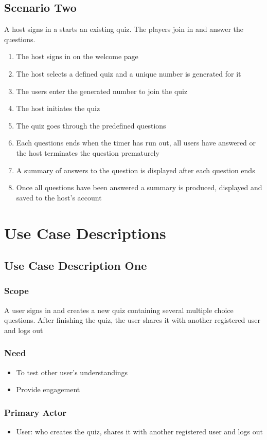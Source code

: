 \documentclass[a4paper]{article}
\begin{document}
	\subsection{Scenario Two}
	A host signs in a starts an existing quiz. The players join in and answer the questions.
	\begin{enumerate}
		\item The host signs in on the welcome page
		\item The host selects a defined quiz and a unique number is generated for it
		\item The users enter the generated number to join the quiz
		\item The host initiates the quiz
		\item The quiz goes through the predefined questions
		\item Each questions ends when the timer has run out, all users have answered or the host terminates the question prematurely
		\item A summary of answers to the question is displayed after each question ends
		\item Once all questions have been answered a summary is produced, displayed and saved to the host's account
	\end{enumerate}
	
	\newpage
	\section{Use Case Descriptions}
	\subsection{Use Case Description One}
	\subsubsection{Scope}
	A user signs in and creates a new quiz containing several multiple choice
questions. After finishing the quiz, the user shares it with another registered
user and logs out
	\subsubsection{Need}
	\begin{itemize}
		\item To test other user's understandings
		\item Provide engagement
	\end{itemize}
	\subsubsection{Primary Actor}
	\begin{itemize}
		\item User: who creates the quiz, shares it with another registered user and logs out
	\end{itemize}
\end{document}
